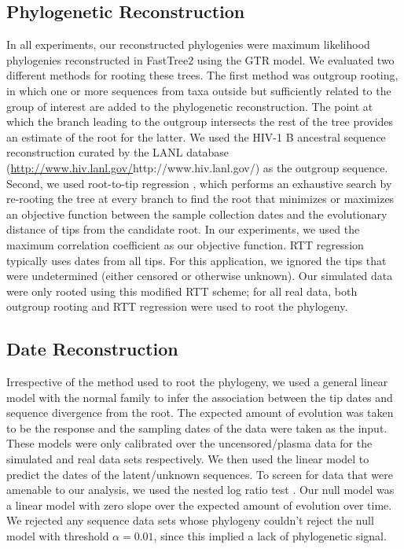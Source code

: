 \documentclass[12pt]{article}
\begin{document}
\subsection * {Phylogenetic Reconstruction} \label{subsec:phylo}
In all experiments, our reconstructed phylogenies were maximum likelihood phylogenies reconstructed in FastTree2 using the GTR model.
We evaluated two different methods for rooting these trees. 
The first method was outgroup rooting, in which one or more sequences from taxa outside but sufficiently related to the group of interest are added to the phylogenetic reconstruction.
The point at which the branch leading to the outgroup intersects the rest of the tree provides an estimate of the root for the latter.
We used the HIV-1 B ancestral sequence reconstruction curated by the LANL database (\url{http://www.hiv.lanl.gov/}{http://www.hiv.lanl.gov/}) as the outgroup sequence.
Second, we used root-to-tip regression \citep[RTT;][]{Korber00}, which performs an exhaustive search by re-rooting the tree at every branch to find the root that minimizes or maximizes an objective function between the sample collection dates and the evolutionary distance of tips from the candidate root.
In our experiments, we used the maximum correlation coefficient as our objective function.
RTT regression typically uses dates from all tips.
For this application, we ignored the tips that were undetermined (either censored or otherwise unknown). 
Our simulated data were only rooted using this modified RTT scheme; for all real data, both outgroup rooting and RTT regression were used to root the phylogeny. 


\subsection * {Date Reconstruction} \label{subsec:daterecon}
Irrespective of the method used to root the phylogeny, we used a general linear model with the normal family to infer the association between the tip dates and sequence divergence from the root. 
The expected amount of evolution was taken to be the response and the sampling dates of the data were taken as the input. 
These models were only calibrated over the uncensored/plasma data for the simulated and real data sets respectively.
We then used the linear model to predict the dates of the latent/unknown sequences.
To screen for data that were amenable to our analysis, we used the nested log ratio test \citep{Ho14}. 
Our null model was a linear model with zero slope over the expected amount of evolution over time. 
We rejected any sequence data sets whose phylogeny couldn't reject the null model with threshold $\alpha=0.01$, since this implied a lack of phylogenetic signal.
\end{document}

